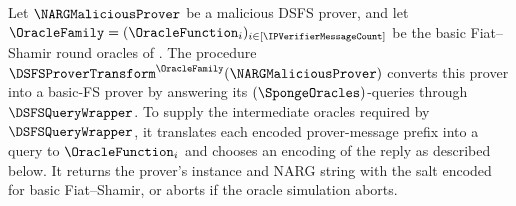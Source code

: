 \begin{definition}[D2SAlgo]
\label{def:dsfs_d2salgo}
\leanok
{}
Let \(\NARGMaliciousProver\) be a malicious DSFS prover, and let \(\OracleFamily=(\OracleFunction_i)_{i\in[\IPVerifierMessageCount]}\) be the basic Fiat--Shamir round oracles of . The procedure \(\DSFSProverTransform^{\OracleFamily}(\NARGMaliciousProver)\) converts this prover into a basic-FS prover by answering its \((\SpongeOracles)\)-queries through \(\DSFSQueryWrapper\). To supply the intermediate oracles required by \(\DSFSQueryWrapper\), it translates each encoded prover-message prefix into a query to \(\OracleFunction_i\) and chooses an encoding of the reply as described below. It returns the prover's instance and NARG string with the salt encoded for basic Fiat--Shamir, or aborts if the oracle simulation aborts.


\end{definition}
